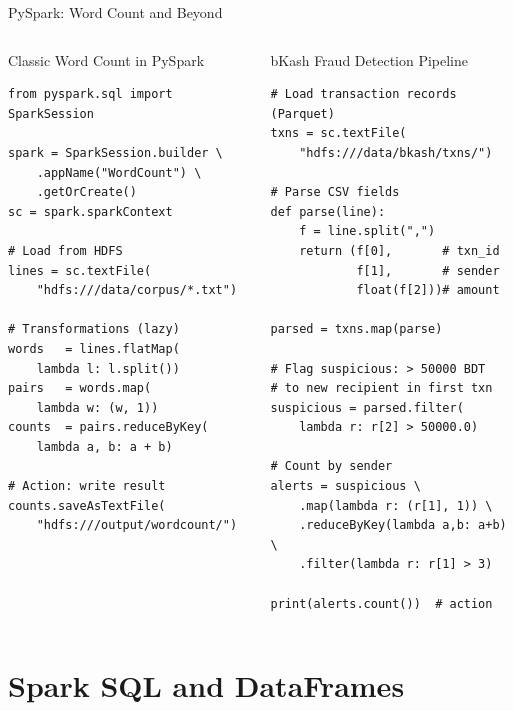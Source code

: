 \documentclass[aspectratio=169,10pt]{beamer}
\begin{document}
\begin{frame}[fragile]{PySpark: Word Count and Beyond}
  \begin{columns}[T]
      \begin{exampleblock}{Classic Word Count in PySpark}
        \begin{lstlisting}
from pyspark.sql import SparkSession

spark = SparkSession.builder \
    .appName("WordCount") \
    .getOrCreate()
sc = spark.sparkContext

# Load from HDFS
lines = sc.textFile(
    "hdfs:///data/corpus/*.txt")

# Transformations (lazy)
words   = lines.flatMap(
    lambda l: l.split())
pairs   = words.map(
    lambda w: (w, 1))
counts  = pairs.reduceByKey(
    lambda a, b: a + b)

# Action: write result
counts.saveAsTextFile(
    "hdfs:///output/wordcount/")
        \end{lstlisting}
      \end{exampleblock}

      \begin{exampleblock}{bKash Fraud Detection Pipeline}
        \begin{lstlisting}
# Load transaction records (Parquet)
txns = sc.textFile(
    "hdfs:///data/bkash/txns/")

# Parse CSV fields
def parse(line):
    f = line.split(",")
    return (f[0],       # txn_id
            f[1],       # sender
            float(f[2]))# amount

parsed = txns.map(parse)

# Flag suspicious: > 50000 BDT
# to new recipient in first txn
suspicious = parsed.filter(
    lambda r: r[2] > 50000.0)

# Count by sender
alerts = suspicious \
    .map(lambda r: (r[1], 1)) \
    .reduceByKey(lambda a,b: a+b) \
    .filter(lambda r: r[1] > 3)

print(alerts.count())  # action
        \end{lstlisting}
      \end{exampleblock}
  \end{columns}
\end{frame}

\section{Spark SQL and DataFrames}
\end{document}
